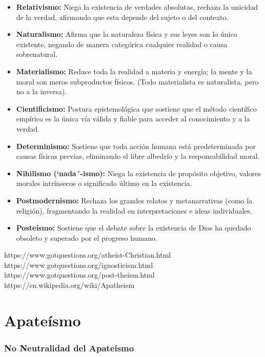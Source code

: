 \documentclass[12pt]{report}
\begin{document}
	\begin{minibloque}[Definiciones]
		\begin{itemize}
			\item \textbf{Relativismo:} Niega la existencia de verdades absolutas, rechaza la unicidad de la verdad, afirmando que esta depende del sujeto o del contexto.
			\item \textbf{Naturalismo:} Afirma que la naturaleza física y sus leyes son lo único existente, negando de manera categórica cualquier realidad o causa sobrenatural.
			\item \textbf{Materialismo:} Reduce toda la realidad a materia y energía; la mente y la moral son meros subproductos físicos. (Todo materialista es naturalista, pero no a la inversa).
			\item \textbf{Cientificismo:} Postura epistemológica que sostiene que el método científico empírico es la única vía válida y fiable para acceder al conocimiento y a la verdad.
			\item \textbf{Determinismo:} Sostiene que toda acción humana está predeterminada por causas físicas previas, eliminando el libre albedrío y la responsabilidad moral.
			\item \textbf{Nihilismo (`nada´-ismo):} Niega la existencia de propósito objetivo, valores morales intrínsecos o significado último en la existencia.
			\item \textbf{Postmodernismo:} Rechaza los grandes relatos y metanarrativas (como la religión), fragmentando la realidad en interpretaciones e ideas individuales.
			\item \textbf{Posteísmo:} Sostiene que el debate sobre la existencia de Dios ha quedado obsoleto y superado por el progreso humano.
		\end{itemize}
	\end{minibloque}
	
	https://www.gotquestions.org/atheist-Christian.html\\
	https://www.gotquestions.org/ignosticism.html\\
	https://www.gotquestions.org/post-theism.html\\
	https://en.wikipedia.org/wiki/Apatheism
	
	\section{Apateísmo}
	
	\subsubsection{No Neutralidad del Apateísmo}
	
\end{document}
